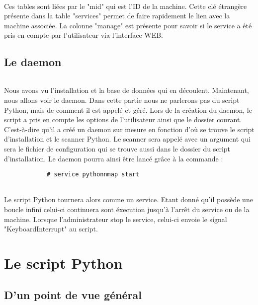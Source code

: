 \documentclass[12pt]{report}
\begin{document}
		\paragraph{}
			Ces tables sont liées par le "mid" qui est l'ID de la machine. Cette clé étrangère présente dans la table "services" permet de faire rapidement le lien avec la machine associée. La colonne "manage" est présente pour savoir si le service a été pris en compte par l'utilisateur via l'interface WEB.
	\chapter{Le daemon}
		\paragraph{}
			Nous avons vu l'installation et la base de données qui en découlent. Maintenant, nous allons voir le daemon. Dans cette partie nous ne parlerons pas du script Python, mais de comment il est appelé et géré. Lors de la création du daemon, le script a pris en compte les options de l'utilisateur ainsi que le dossier courant. C'est-à-dire qu'il a créé un daemon sur mesure en fonction d'où se trouve le script d'installation et le scanner Python. Le scanner sera appelé avec un argument qui sera le fichier de configuration qui se trouve aussi dans le dossier du script d'installation. Le daemon pourra ainsi être lancé grâce à la commande :
			\begin{lstlisting}
			# service pythonnmap start
			\end{lstlisting}
		\paragraph{}
			Le script Python tournera alors comme un service. Etant donné qu'il possède une boucle infini celui-ci continuera sont éxecution jusqu'à l'arrêt du service ou de la machine. Lorsque l'administrateur stop le service, celui-ci envoie le signal "KeyboardInterrupt" au script.
\part{Le script Python}
	\chapter{D'un point de vue général}
\end{document}
